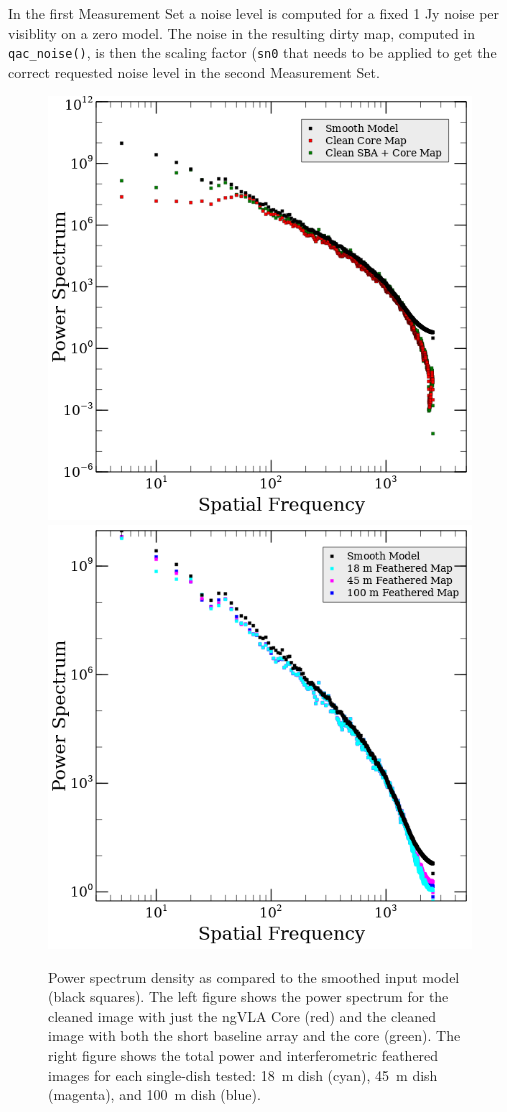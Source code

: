\documentclass[11pt,twoside]{article}
\begin{document}
In the first Measurement Set a noise level is computed for a fixed 1 Jy noise per visiblity on a
zero model. The noise in the resulting dirty map, computed in {\tt qac\_noise()}, is then the scaling factor ({\tt sn0}
that needs to be applied to get the correct requested noise level in the second Measurement Set.








\newpage

\begin{figure}
\centering
\includegraphics[width=0.49\columnwidth]{figs54/psd1_revised.png}
\includegraphics[width=0.49\columnwidth]{figs54/psd2_revised.png}
\caption{Power spectrum density as compared to the smoothed input model (black squares). The left figure shows the power spectrum for the cleaned image with just the ngVLA Core (red) and the cleaned image with both the short baseline array and the core (green). The right figure shows the total power and interferometric feathered images for each single-dish tested: \SI{18}{\meter} dish (cyan), \SI{45}{\meter} dish (magenta), and \SI{100}{\meter} dish (blue).}
\label{fig:psd}
\end{figure}
\end{document}
